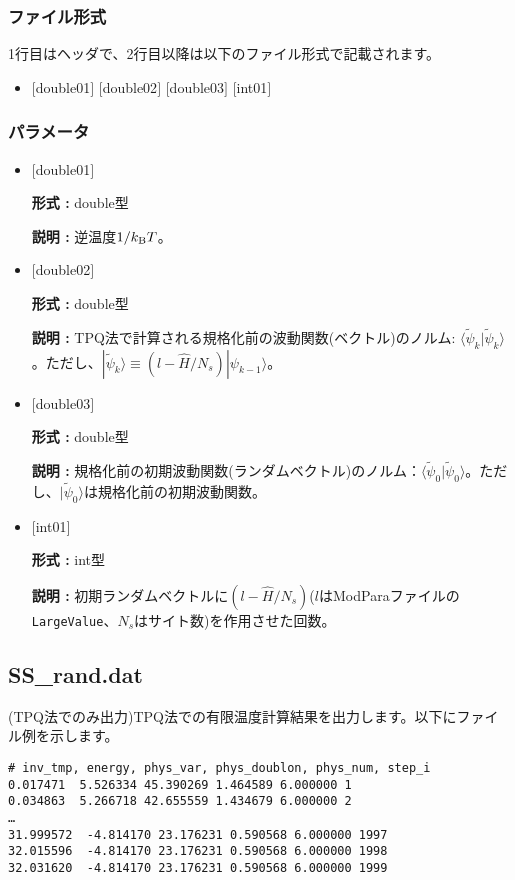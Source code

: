 \subsubsection{ファイル形式}
1行目はヘッダで、2行目以降は以下のファイル形式で記載されます。
 \begin{itemize}
   \item $[$double01$]$ $[$double02$]$ $[$double03$]$ $[$int01$]$
  \end{itemize}
\subsubsection{パラメータ}
 \begin{itemize}

  \item  $[$double01$]$
  
 {\bf 形式 :} double型

{\bf 説明 :} 逆温度$1/{k_{\rm B}T}$。
 
  \item $[$double02$]$

 {\bf 形式 :} double型 

{\bf 説明 :}  TPQ法で計算される規格化前の波動関数(ベクトル)のノルム:
 $\langle \tilde{\psi}_{k} |\tilde{\psi}_{k}\rangle$。ただし、$|\tilde{\psi}_{k}\rangle \equiv(l-\hat{H}/N_{s})|\psi_{k-1}\rangle$。

  \item $[$double03$]$

 {\bf 形式 :} double型 

{\bf 説明 :} 規格化前の初期波動関数(ランダムベクトル)のノルム：$\langle \tilde{\psi}_{0} |\tilde{\psi}_{0}\rangle$。ただし、$|\tilde{\psi}_{0}\rangle$は規格化前の初期波動関数。

  \item $[$int01$]$

 {\bf 形式 :} int型 

{\bf 説明 :} 初期ランダムベクトルに$(l-\hat{H}/N_{s})$($l$はModParaファイルの\verb|LargeValue|、$N_{s}$はサイト数)を作用させた回数。

 \end{itemize}


\newpage
\subsection{SS\_rand.dat}
\label{Subsec:ssrand}
(TPQ法でのみ出力)TPQ法での有限温度計算結果を出力します。以下にファイル例を示します。\\
\begin{minipage}{15cm}
\begin{screen}
\begin{verbatim}
# inv_tmp, energy, phys_var, phys_doublon, phys_num, step_i
0.017471  5.526334 45.390269 1.464589 6.000000 1
0.034863  5.266718 42.655559 1.434679 6.000000 2
…
31.999572  -4.814170 23.176231 0.590568 6.000000 1997
32.015596  -4.814170 23.176231 0.590568 6.000000 1998
32.031620  -4.814170 23.176231 0.590568 6.000000 1999
\end{verbatim}
\end{screen}
\end{minipage}

